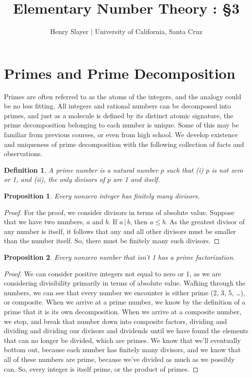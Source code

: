 \documentclass{article}
\newtheorem{prop}{Proposition}
\newtheorem{definition}{Definition}
\newcommand{\divv}{\,|\,}
\begin{document}
 

\title{Elementary Number Theory : \S 3} 
\author{Henry Slayer $|$ University of California, Santa Cruz} 
\date{}
\maketitle
\section*{Primes and Prime Decomposition}
Primes are often referred to as the atoms of the integers, and the analogy could be no less fitting. All integers and rational numbers can be decomposed into primes, and just as a molecule is defined by its distinct atomic signature, the prime decomposition belonging to each number is unique. Some of this may be familiar from previous courses, or even from high school. We develop existence and uniqueness of prime decomposition with the following collection of facts and observations. 
\begin{mdframed}
\begin{definition} 
A prime number is a natural number $p$ such that (i) $p$ is not zero or 1, and (ii), the only divisors of $p$ are 1 and itself. 
\end{definition}  
\begin{prop} 
Every nonzero integer has finitely many divisors. 
\end{prop} 
\begin{proof} 
For the proof, we consider divisors in terms of absolute value. Suppose that we have two numbers, $a$ and $b$. If $a\divv b$, then $a\leq b$. As the greatest divisor of any number is itself, it follows that any and all other divisors must be smaller than the number itself. So, there must be finitely many such divisors. 
\end{proof} 
\begin{prop} 
Every nonzero number that isn't 1 has a prime factorization. 
\end{prop} 
\begin{proof} 
We can consider positive integers not equal to zero or 1, as we are considering divisibility primarily in terms of absolute value. Walking through the numbers, we can see that every number we encounter is either prime (2, 3, 5, \dots), or composite. When we arrive at a prime number, we know by the definition of a prime that it is its own decomposition. When we arrive at a composite number, we stop, and break that number down into composite factors, dividing and dividing and dividing our divisors and dividends until we have found the elements that can no longer be divided, which are primes. We know that we'll eventually bottom out, because each number has finitely many divisors, and we know that all of these numbers are prime, because we've divided as much as we possibly can. So, every integer is itself prime, or the product of primes. 
\end{proof} 
\end{mdframed} 
\end{document}

